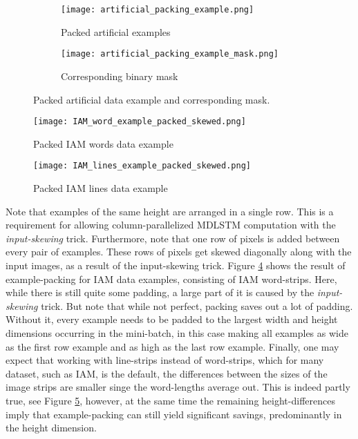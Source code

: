 \documentclass[conference]{IEEEtran}
\renewcommand{\ac}[1]{\gls{#1}}
\begin{document}
\begin{figure}[h!]
\begin{center}
  \begin{subfigure}[b]{0.24\textwidth}
  \texttt{[image: artificial\_packing\_example.png]}
  \caption{Packed artificial examples}
  \label{figure:example-packing-artificial-example-input}
  \end{subfigure}
  \begin{subfigure}[b]{.24\textwidth}
  \texttt{[image: artificial\_packing\_example\_mask.png]}
  \caption{Corresponding binary mask}
  \label{figure:example-packing-artificial-example-mask}
  \end{subfigure}
\end{center}
\caption{Packed artificial data example and corresponding mask.}
\label{figure:example-packing-artificial-example}
\end{figure}

\begin{figure*}[h!]
\begin{center}
  \begin{subfigure}[b]{0.3\textwidth}
  \texttt{[image: IAM\_word\_example\_packed\_skewed.png]}
  \caption{Packed IAM words data example}
  \label{figure:example-packing-iam-words}
  \end{subfigure}
  \begin{subfigure}[b]{0.6\textwidth}
  \texttt{[image: IAM\_lines\_example\_packed\_skewed.png]} 
  \caption{Packed IAM lines data example}
  \label{figure:example-packing-iam-lines} 
  \end{subfigure}
\end{center}
\caption{Packed IAM words and lines data}
\end{figure*}

Note that examples of the same height are arranged 
in a single row. This is a requirement for allowing column-parallelized \ac{MDLSTM} 
computation with the \emph{input-skewing} trick. 
Furthermore, note that one row of pixels is added between every pair of 
examples. These rows of pixels get skewed diagonally along with the 
input images, as a result of the input-skewing trick. 
Figure \ref{figure:example-packing-iam-words} shows the result of 
example-packing for IAM data examples, consisting of IAM word-strips.
Here, while there is still quite some padding, a large part of it is 
caused by the \emph{input-skewing} trick. But note that while not perfect, 
packing saves out a lot of padding. Without it, every example needs to be padded 
to the largest width and height dimensions occurring in the mini-batch, in this case making
all examples as wide as the first row example and as high as the last row example.
Finally, one may expect that working with line-strips instead of word-strips, 
which for many dataset, such as IAM, is the default, the differences between 
the sizes of the image strips are smaller singe the word-lengths average out.
This is indeed partly true, see Figure \ref{figure:example-packing-iam-lines},
however, at the same time the remaining height-differences imply that 
example-packing can still yield significant savings, predominantly 
in the height dimension.
\end{document}
